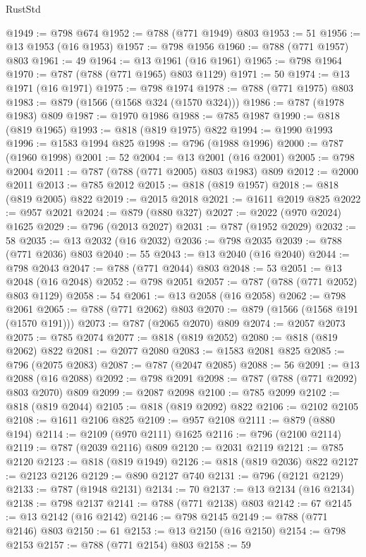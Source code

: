 \begin{lexlean}{RustStd}
\begin{coremodule}
@1949 := @798 @674
@1952 := @788 (@771 @1949) @803
@1953 := 51
@1956 := @13 @1953 (@16 @1953)
@1957 := @798 @1956
@1960 := @788 (@771 @1957) @803
@1961 := 49
@1964 := @13 @1961 (@16 @1961)
@1965 := @798 @1964
@1970 := @787 (@788 (@771 @1965) @803 @1129)
@1971 := 50
@1974 := @13 @1971 (@16 @1971)
@1975 := @798 @1974
@1978 := @788 (@771 @1975) @803
@1983 := @879 (@1566 (@1568 @324 (@1570 @324)))
@1986 := @787 (@1978 @1983) @809
@1987 := @1970 @1986
@1988 := @785 @1987
@1990 := @818 (@819 @1965)
@1993 := @818 (@819 @1975) @822
@1994 := @1990 @1993
@1996 := @1583 @1994 @825
@1998 := @796 (@1988 @1996)
@2000 := @787 (@1960 @1998)
@2001 := 52
@2004 := @13 @2001 (@16 @2001)
@2005 := @798 @2004
@2011 := @787 (@788 (@771 @2005) @803 @1983) @809
@2012 := @2000 @2011
@2013 := @785 @2012
@2015 := @818 (@819 @1957)
@2018 := @818 (@819 @2005) @822
@2019 := @2015 @2018
@2021 := @1611 @2019 @825
@2022 := @957 @2021
@2024 := @879 (@880 @327)
@2027 := @2022 (@970 @2024) @1625
@2029 := @796 (@2013 @2027)
@2031 := @787 (@1952 @2029)
@2032 := 58
@2035 := @13 @2032 (@16 @2032)
@2036 := @798 @2035
@2039 := @788 (@771 @2036) @803
@2040 := 55
@2043 := @13 @2040 (@16 @2040)
@2044 := @798 @2043
@2047 := @788 (@771 @2044) @803
@2048 := 53
@2051 := @13 @2048 (@16 @2048)
@2052 := @798 @2051
@2057 := @787 (@788 (@771 @2052) @803 @1129)
@2058 := 54
@2061 := @13 @2058 (@16 @2058)
@2062 := @798 @2061
@2065 := @788 (@771 @2062) @803
@2070 := @879 (@1566 (@1568 @191 (@1570 @191)))
@2073 := @787 (@2065 @2070) @809
@2074 := @2057 @2073
@2075 := @785 @2074
@2077 := @818 (@819 @2052)
@2080 := @818 (@819 @2062) @822
@2081 := @2077 @2080
@2083 := @1583 @2081 @825
@2085 := @796 (@2075 @2083)
@2087 := @787 (@2047 @2085)
@2088 := 56
@2091 := @13 @2088 (@16 @2088)
@2092 := @798 @2091
@2098 := @787 (@788 (@771 @2092) @803 @2070) @809
@2099 := @2087 @2098
@2100 := @785 @2099
@2102 := @818 (@819 @2044)
@2105 := @818 (@819 @2092) @822
@2106 := @2102 @2105
@2108 := @1611 @2106 @825
@2109 := @957 @2108
@2111 := @879 (@880 @194)
@2114 := @2109 (@970 @2111) @1625
@2116 := @796 (@2100 @2114)
@2119 := @787 (@2039 @2116) @809
@2120 := @2031 @2119
@2121 := @785 @2120
@2123 := @818 (@819 @1949)
@2126 := @818 (@819 @2036) @822
@2127 := @2123 @2126
@2129 := @890 @2127 @740
@2131 := @796 (@2121 @2129)
@2133 := @787 (@1948 @2131)
@2134 := 70
@2137 := @13 @2134 (@16 @2134)
@2138 := @798 @2137
@2141 := @788 (@771 @2138) @803
@2142 := 67
@2145 := @13 @2142 (@16 @2142)
@2146 := @798 @2145
@2149 := @788 (@771 @2146) @803
@2150 := 61
@2153 := @13 @2150 (@16 @2150)
@2154 := @798 @2153
@2157 := @788 (@771 @2154) @803
@2158 := 59

\end{coremodule}
\end{lexlean}
